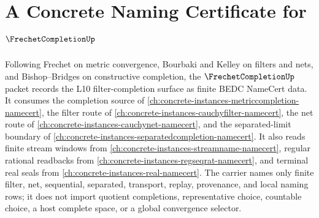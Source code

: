 \chapter{A Concrete Naming Certificate for $\FrechetCompletionUp$}
\label{ch:concrete-instances-frechet-completion-namecert}

Following Frechet on metric convergence, Bourbaki and Kelley on filters and nets, and Bishop--Bridges on constructive completion, the $\FrechetCompletionUp$ packet records the L10 filter-completion surface as finite BEDC NameCert data. It consumes the completion source of \autoref{ch:concrete-instances-metriccompletion-namecert}, the filter route of \autoref{ch:concrete-instances-cauchyfilter-namecert}, the net route of \autoref{ch:concrete-instances-cauchynet-namecert}, and the separated-limit boundary of \autoref{ch:concrete-instances-separatedcompletion-namecert}. It also reads finite stream windows from \autoref{ch:concrete-instances-streamname-namecert}, regular rational readbacks from \autoref{ch:concrete-instances-regseqrat-namecert}, and terminal real seals from \autoref{ch:concrete-instances-real-namecert}. The carrier names only finite filter, net, sequential, separated, transport, replay, provenance, and local naming rows; it does not import quotient completions, representative choice, countable choice, a host complete space, or a global convergence selector.

